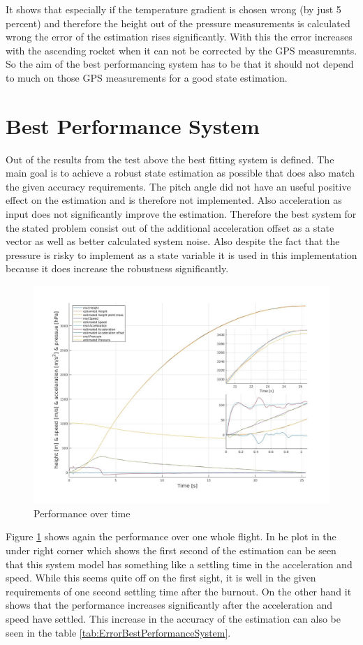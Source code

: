 It shows that especially if the temperature gradient is chosen wrong (by just 5 percent) and
therefore the height out of the pressure measurements is calculated wrong the error of the estimation rises significantly.
With this the error increases with the ascending rocket when it can not be corrected by the GPS measuremnts.
So the aim of the best performancing system has to be that it should not depend to much on those GPS measurements for a good state estimation.

\newpage
\section{Best Performance System}
Out of the results from the test above the best fitting system is defined.
The main goal is to achieve a robust state estimation as possible that does also match the given accuracy requirements.
The pitch angle did not have an useful positive effect on the estimation and is therefore not implemented.
Also acceleration as input does not significantly improve the estimation.
Therefore the best system for the stated problem consist out of the additional acceleration offset as a state vector as well as better calculated system noise.
Also despite the fact that the pressure is risky to implement as a state variable it is used in this implementation because it does increase the robustness significantly.

\begin{figure}[h!]
 \centering
 \includegraphics[width=.8\textwidth]{./Pictures/BestSystemPerformance.jpg}
 \caption{Performance over time}
 \label{fig:BestSystemPerformance}
\end{figure}

Figure \ref{fig:BestSystemPerformance} shows again the performance over one whole flight.
In he plot in the under right corner which shows the first second of the estimation can be seen that this system model has something like a settling time in the acceleration and speed.
While this seems quite off on the first sight, it is well in the given requirements of one second settling time after the burnout.
On the other hand it shows that the performance increases significantly after the acceleration and speed have settled.
This increase in the accuracy of the estimation can also be seen in the table \ref{tab:ErrorBestPerformanceSystem}.

